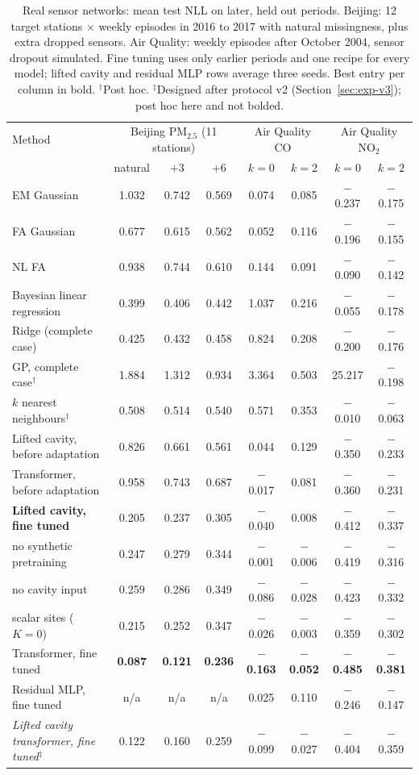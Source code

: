 \begin{table}[t]
\centering\small
\setlength{\tabcolsep}{2.5pt}
\caption{\label{tab:real}Real sensor networks: mean test NLL on later, held out periods. Beijing: 12 target stations $\times$ weekly episodes in 2016 to 2017 with natural missingness, plus extra dropped sensors. Air Quality: weekly episodes after October 2004, sensor dropout simulated. Fine tuning uses only earlier periods and one recipe for every model; lifted cavity and residual MLP rows average three seeds. Best entry per column in bold. $^\dagger$Post hoc. $^\ddagger$Designed after protocol v2 (Section~\ref{sec:exp-v3}); post hoc here and not bolded.}
\begin{tabular}{lccccccc}
\toprule
Method & \multicolumn{3}{c}{Beijing PM$_{2.5}$ (11 stations)} & \multicolumn{2}{c}{Air Quality CO} & \multicolumn{2}{c}{Air Quality NO$_2$}\\
 & natural & $+3$ & $+6$ & $k{=}0$ & $k{=}2$ & $k{=}0$ & $k{=}2$\\
\midrule
EM Gaussian & 1.032 & 0.742 & 0.569 & 0.074 & 0.085 & $-$0.237 & $-$0.175\\
FA Gaussian & 0.677 & 0.615 & 0.562 & 0.052 & 0.116 & $-$0.196 & $-$0.155\\
NL FA & 0.938 & 0.744 & 0.610 & 0.144 & 0.091 & $-$0.090 & $-$0.142\\
Bayesian linear regression & 0.399 & 0.406 & 0.442 & 1.037 & 0.216 & $-$0.055 & $-$0.178\\
Ridge (complete case) & 0.425 & 0.432 & 0.458 & 0.824 & 0.208 & $-$0.200 & $-$0.176\\
GP, complete case$^\dagger$ & 1.884 & 1.312 & 0.934 & 3.364 & 0.503 & 25.217 & $-$0.198\\
$k$ nearest neighbours$^\dagger$ & 0.508 & 0.514 & 0.540 & 0.571 & 0.353 & $-$0.010 & $-$0.063\\
\midrule
Lifted cavity, before adaptation & 0.826 & 0.661 & 0.561 & 0.044 & 0.129 & $-$0.350 & $-$0.233\\
Transformer, before adaptation & 0.958 & 0.743 & 0.687 & $-$0.017 & 0.081 & $-$0.360 & $-$0.231\\
\midrule
\textbf{Lifted cavity, fine tuned} & 0.205 & 0.237 & 0.305 & $-$0.040 & 0.008 & $-$0.412 & $-$0.337\\
\quad no synthetic pretraining & 0.247 & 0.279 & 0.344 & $-$0.001 & $-$0.006 & $-$0.419 & $-$0.316\\
\quad no cavity input & 0.259 & 0.286 & 0.349 & $-$0.086 & $-$0.028 & $-$0.423 & $-$0.332\\
\quad scalar sites ($K=0$) & 0.215 & 0.252 & 0.347 & $-$0.026 & $-$0.003 & $-$0.359 & $-$0.302\\
Transformer, fine tuned & \textbf{0.087} & \textbf{0.121} & \textbf{0.236} & \textbf{$-$0.163} & \textbf{$-$0.052} & \textbf{$-$0.485} & \textbf{$-$0.381}\\
Residual MLP, fine tuned & n/a & n/a & n/a & 0.025 & 0.110 & $-$0.246 & $-$0.147\\
\emph{Lifted cavity transformer, fine tuned}$^\ddagger$ & 0.122 & 0.160 & 0.259 & $-$0.099 & $-$0.027 & $-$0.404 & $-$0.359\\
\bottomrule
\end{tabular}
\end{table}
